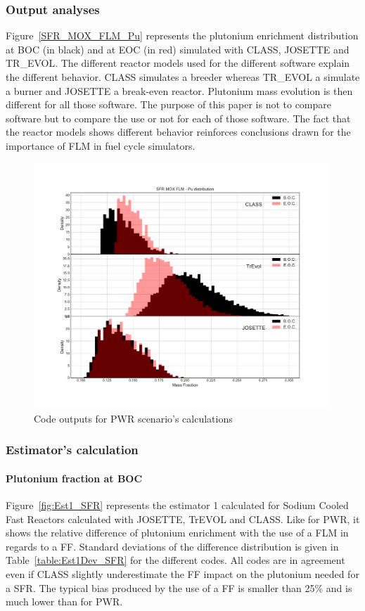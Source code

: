 \subsubsection{Output analyses}
Figure~\ref{SFR_MOX_FLM_Pu} represents the plutonium enrichment distribution at BOC (in black) and at EOC (in red) simulated with CLASS, JOSETTE and TR_EVOL. The different reactor models used for the different software explain the different behavior. CLASS simulates a breeder whereas TR_EVOL a simulate a burner and JOSETTE a break-even reactor. Plutonium mass evolution is then different for all those software. The purpose of this paper is not to compare software but to compare the use or not for each of those software. The fact that the reactor models shows different behavior reinforces conclusions drawn for the importance of FLM in fuel cycle simulators.     
\begin{figure}[h]
	\begin{center}
		\includegraphics[width = 0.99\textwidth]{../../Feature_1/RAW_DATA/FIG/SFR_MOX_FLM_Pu.pdf}
		\caption{Code outputs for PWR scenario's calculations}
		\label{fig:SFR_MOX_FLM_Pu}
	\end{center}
\end{figure}

\subsubsection{Estimator's calculation}
\paragraph{Plutonium fraction at BOC}
Figure~\ref{fig:Est1_SFR} represents the estimator 1 calculated for Sodium Cooled Fast Reactors calculated with JOSETTE, TrEVOL and CLASS. Like for PWR, it shows the relative difference of plutonium enrichment with the use of a FLM in regards to a FF. Standard deviations of the difference distribution is given in Table~\ref{table:Est1Dev_SFR} for the different codes. All codes are in agreement even if CLASS slightly underestimate the FF impact on the plutonium needed for a SFR. The typical bias produced by the use of a FF is smaller than 25\% and is much lower than for PWR.   

